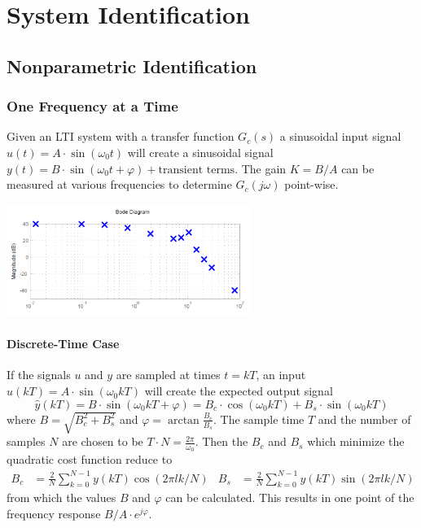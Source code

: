 \section{System Identification}

\subsection{Nonparametric Identification}

\subsubsection{One Frequency at a Time}
\begin{minipage}{10cm}
Given an LTI system with a transfer function $G_c(s)$ a sinusoidal 
input signal $u(t) = A \cdot \sin(\omega_0 t)$ will create a sinusoidal
signal $y(t) = B \cdot \sin(\omega_0 t + \varphi) + \text{transient terms}$.
The gain $K = B/A$ can be measured at various frequencies to determine
$G_c(j\omega)$ point-wise.
\end{minipage}
\hspace{0.5cm}
\begin{minipage}{8cm}
    \centering
    \includegraphics[width=8cm]{bilder/ident_bode.png}
\end{minipage}

\paragraph{Discrete-Time Case}
If the signals $u$ and $y$ are sampled at times $t = kT$, an input
$u(kT) = A \cdot \sin(\omega_0 k T)$
will create the expected output signal
\[
    \hat{y}(kT) = B \cdot \sin(\omega_0 k T + \varphi) 
    = B_c \cdot \cos(\omega_0 k T) + B_s \cdot \sin(\omega_0 k T)
\]
where $B = \sqrt{B_c^2 + B_s^2}$ and $\varphi = \arctan\frac{B_c}{B_s}$.
The sample time $T$ and the number of samples $N$ are chosen to be $T \cdot N = \frac{2\pi}{\omega_0}$.
Then the $B_c$ and $B_s$ which minimize the quadratic cost function reduce to
\begin{align*}
    B_c &= \frac{2}{N}\sum_{k=0}^{N-1} y(kT) \cos(2\pi lk/N) &
    B_s &= \frac{2}{N}\sum_{k=0}^{N-1} y(kT) \sin(2\pi lk/N)
\end{align*}
from which the values $B$ and $\varphi$ can be calculated.
This results in one point of the frequency response $B/A \cdot e^{j\varphi}$.

